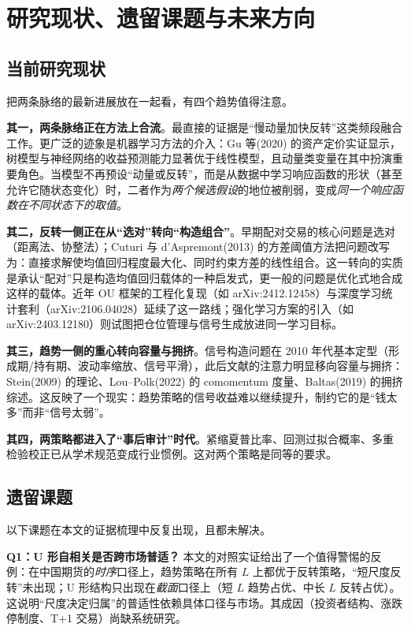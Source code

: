 \section{研究现状、遗留课题与未来方向}\label{sec:future}

\subsection{当前研究现状}

把两条脉络的最新进展放在一起看，有四个趋势值得注意。

\textbf{其一，两条脉络正在方法上合流}。最直接的证据是“慢动量加快反转”这类频段融合工作\cite{wood2021}。更广泛的迹象是机器学习方法的介入：Gu 等(2020) 的资产定价实证显示，树模型与神经网络的收益预测能力显著优于线性模型，且动量类变量在其中扮演重要角色\cite{gu2020}。当模型不再预设“动量或反转”，而是从数据中学习响应函数的形状（甚至允许它随状态变化）时，二者作为\emph{两个候选假设}的地位被削弱，变成\emph{同一个响应函数在不同状态下的取值}。

\textbf{其二，反转一侧正在从“选对”转向“构造组合”}。早期配对交易的核心问题是选对（距离法、协整法）；Cuturi 与 d'Aspremont(2013) 的方差阈值方法把问题改写为：直接求解使均值回归程度最大化、同时约束方差的线性组合\cite{cuturi2013}。这一转向的实质是承认“配对”只是构造均值回归载体的一种启发式，更一般的问题是优化式地合成这样的载体。近年 OU 框架的工程化复现（如 arXiv:2412.12458）与深度学习统计套利（arXiv:2106.04028）延续了这一路线\cite{suchato2024,guijarro2021}；强化学习方案的引入（如 arXiv:2403.12180）则试图把仓位管理与信号生成放进同一学习目标\cite{ning2024}。

\textbf{其三，趋势一侧的重心转向容量与拥挤}。信号构造问题在 2010 年代基本定型（形成期/持有期、波动率缩放、信号平滑），此后文献的注意力明显移向容量与拥挤：Stein(2009) 的理论、Lou--Polk(2022) 的 comomentum 度量、Baltas(2019) 的拥挤综述\cite{stein2009,loupolk2022,baltas2019}。这反映了一个现实：趋势策略的信号收益难以继续提升，制约它的是“钱太多”而非“信号太弱”。

\textbf{其四，两策略都进入了“事后审计”时代}。紧缩夏普比率、回测过拟合概率、多重检验校正已从学术规范变成行业惯例\cite{bailey2014,bailey2016,hlz2016,harveysliu2015}。这对两个策略是同等的要求。

\subsection{遗留课题}

以下课题在本文的证据梳理中反复出现，且都未解决。

\textbf{Q1：U 形自相关是否跨市场普适？} 本文的对照实证给出了一个值得警惕的反例：在中国期货的\emph{时序}口径上，趋势策略在所有 $L$ 上都优于反转策略，“短尺度反转”未出现；U 形结构只出现在\emph{截面}口径上（短 $L$ 趋势占优、中长 $L$ 反转占优）。这说明“尺度决定归属”的普适性依赖具体口径与市场。其成因（投资者结构、涨跌停制度、T+1 交易）尚缺系统研究。


